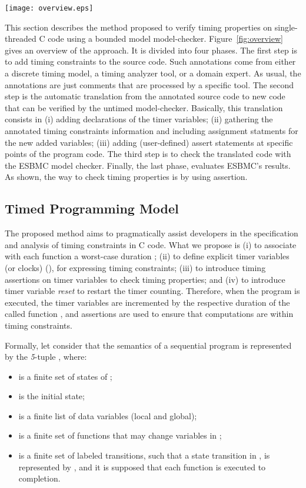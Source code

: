 \documentclass{llncs}
\begin{document}
\begin{figure*}[!t]
	\centering
	\texttt{[image: overview.eps]}
	\caption{Overview of the Proposed Method}
	\label{fig:overview}
\end{figure*} 

This section describes the method proposed to verify timing properties on single-threaded 
C code using a bounded model model-checker.
Figure~\ref{fig:overview} gives an overview of the approach. 
It is divided into four phases. The first step is to add timing constraints to the source code. 
Such annotations come from either a discrete timing model, a timing analyzer tool, or a domain expert.
As usual, the annotations are just comments that are processed by a specific tool. 
The second step is the automatic translation from the annotated source code to new code that can be verified by the untimed model-checker. 
Basically, this translation consists in (i) adding declarations of the timer variables; (ii) gathering the annotated timing constraints 
information and including assignment statments for the new added variables; (iii) adding (user-defined) assert statements at 
specific points of the program code. 
The third step is to check the translated code with the ESBMC model checker. 
Finally, the last phase, evaluates ESBMC's results.
As shown, the way to check timing properties is by using assertion.


\subsection{Timed Programming Model}
\label{section:overview}


The proposed method aims to pragmatically assist developers in the specification and analysis of timing constraints 
in C code.
What we propose is 
(i) to associate with each function  a worst-case duration ; 
(ii) to define explicit timer variables (or clocks) (), 
for expressing timing constraints; 
(iii) to introduce timing assertions on timer variables to check timing properties; and
(iv) to introduce  timer variable {\it reset} to restart the timer counting.
Therefore, when the program is executed, the timer variables are incremented by the respective 
duration  of the called function , and
assertions are used to ensure that computations are within timing constraints. 


Formally,
let consider that the semantics of a sequential program  is represented by the {\it 5}-tuple 
, 
where:
\begin{itemize}
\item  is a finite set of states of ;
\item  is the initial state;
\item  is a finite list of data variables (local and global);
\item  is a finite set of functions that may change variables
in ; 
\item  is a finite set of labeled transitions,
such that a state transition in , 
is represented by 
,  and 
it is supposed that each function  is executed to completion.
\end{itemize}
\end{document}
